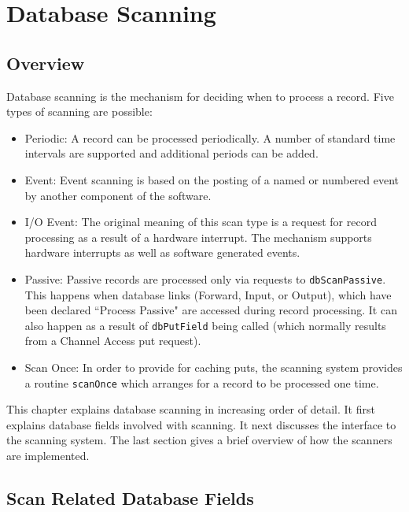 \chapter{Database Scanning}

\section{Overview}

Database scanning is the mechanism for deciding when to process a record.
Five types of scanning are possible:

\begin{itemize}
\item Periodic: A record can be processed periodically.
A number of standard time intervals are supported and additional periods can be added.

\item Event: Event scanning is based on the posting of a named or numbered event by another component of the software.

\item I/O Event: The original meaning of this scan type is a request for record processing as a result of a hardware interrupt.
The mechanism supports hardware interrupts as well as software generated events.

\item Passive: Passive records are processed only via requests to \verb|dbScanPassive|.
This happens when database links (Forward, Input, or Output), which have been declared ``Process Passive" are accessed during record processing.
It can also happen as a result of \verb|dbPutField| being called (which normally results from a Channel Access put request).

\item Scan Once: In order to provide for caching puts, the scanning system provides a routine \verb|scanOnce| which arranges for a record to be processed one time.

\end{itemize}

This chapter explains database scanning in increasing order of detail.
It first explains database fields involved with scanning.
It next discusses the interface to the scanning system.
The last section gives a brief overview of how the scanners are implemented.

\section{Scan Related Database Fields}

